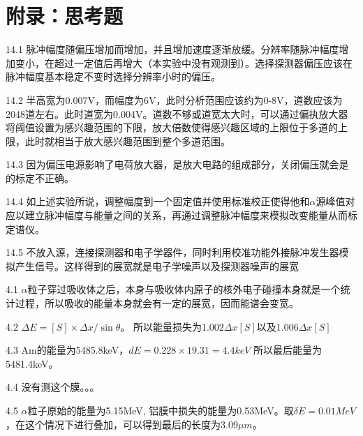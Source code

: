\documentclass[a4paper,10.0pt,twoside]{npr}
\begin{document}
\newpage


\section*{附录：思考题}

14.1 脉冲幅度随偏压增加而增加，并且增加速度逐渐放缓。分辨率随脉冲幅度增加变小，在超过一定值后再增大（本实验中没有观测到）。选择探测器偏压应该在脉冲幅度基本稳定不变时选择分辨率小时的偏压。

14.2 半高宽为0.007V，而幅度为6V，此时分析范围应该约为0-8V，道数应该为2048道左右。此时道宽为0.004V。道数不够或道宽太大时，可以通过偏执放大器将阈值设置为感兴趣范围的下限，放大倍数使得感兴趣区域的上限位于多道的上限，此时就相当于放大感兴趣范围到整个多道范围。

14.3 因为偏压电源影响了电荷放大器，是放大电路的组成部分，关闭偏压就会是的标定不正确。

14.4 如上述实验所说，调整幅度到一个固定值并使用标准校正使得他和$\alpha$源峰值对应以建立脉冲幅度与能量之间的关系，再通过调整脉冲幅度来模拟改变能量从而标定谱仪。

14.5 不放入源，连接探测器和电子学器件，同时利用校准功能外接脉冲发生器模拟产生信号。这样得到的展宽就是电子学噪声以及探测器噪声的展宽

4.1 $\alpha$粒子穿过吸收体之后，本身与吸收体内原子的核外电子碰撞本身就是一个统计过程，所以吸收的能量本身就会有一定的展宽，因而能谱会变宽。

4.2 $\Delta E = [S] \times \Delta x / \sin{\theta}$。 所以能量损失为$1.002\Delta x [S]$以及$1.006\Delta x [S]$

4.3 Am的能量为5485.8keV，$d E = 0.228 \times 19.31 = 4.4 keV$ 所以最后能量为5481.4keV。

4.4 没有测这个膜。。。

4.5 $\alpha$粒子原始的能量为5.15MeV, 铝膜中损失的能量为0.53MeV。取$\delta E = 0.01MeV$，在这个情况下进行叠加，可以得到最后的长度为3.09$\mu m$。
\end{document}
